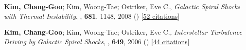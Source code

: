 \item[{30.}]\textbf{Kim, Chang-Goo}; Kim, Woong-Tae; Ostriker, Eve C., \textit{Galactic Spiral Shocks with Thermal Instability}, , \textbf{681}, 1148, 2008 () [\href{http://adsabs.harvard.edu/abs/2008ApJ...681.1148K}{52 citations}]

\item[{29.}]\textbf{Kim, Chang-Goo}; Kim, Woong-Tae; Ostriker, Eve C., \textit{Interstellar Turbulence Driving by Galactic Spiral Shocks}, , \textbf{649}, 2006 () [\href{http://adsabs.harvard.edu/abs/2006ApJ...649L..13K}{44 citations}]